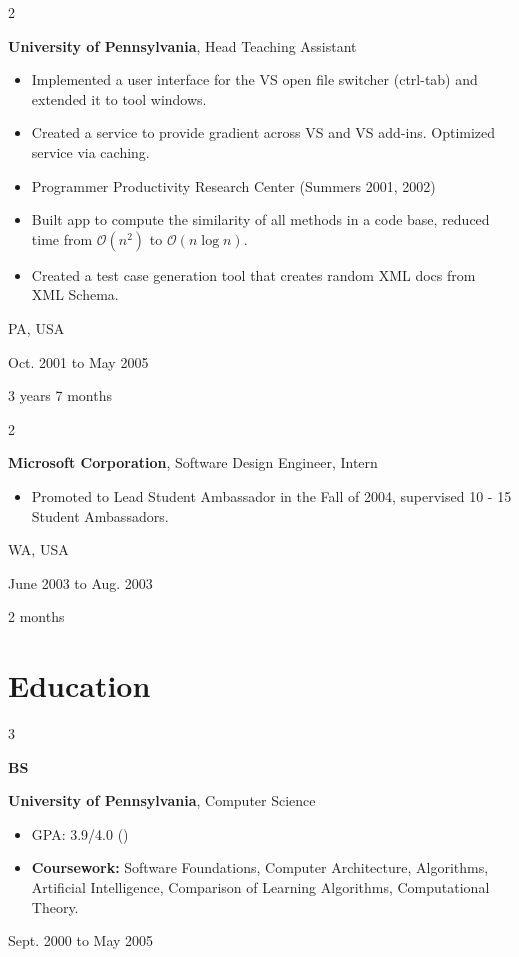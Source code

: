 \documentclass[10pt, letterpaper]{article}
\newenvironment{highlights}{
    \begin{itemize}[
        topsep=0.10 cm,
        parsep=0.10 cm,
        partopsep=0pt,
        itemsep=0pt,
        leftmargin=0.4 cm + 10pt
    ]
    }{
    \end{itemize}
} %
\newenvironment{twocolentry}[2][]{
    \onecolentry
    \def\secondColumn{#2}
    \setcolumnwidth{\fill, 4.5 cm}
    \begin{paracol}{2}
    }{
        \switchcolumn \raggedleft \secondColumn
    \end{paracol}
    \endonecolentry
} %
\newenvironment{threecolentry}[3][]{
    \onecolentry
    \def\thirdColumn{#3}
    \setcolumnwidth{1 cm, \fill, 4.5 cm}
    \begin{paracol}{3}
    {\raggedright #2} \switchcolumn
    }{
    \switchcolumn \raggedleft \thirdColumn
    \end{paracol}
    \endonecolentry
} %
\let\hrefWithoutArrow\href
\renewcommand{\href}[2]{\hrefWithoutArrow{#1}{\mbox{\ifthenelse{\equal{#2}{}}{ }{#2 }\raisebox{.15ex}{\footnotesize \faExternalLink*}}}}
\begin{document}
    \vspace{0.2 cm}

    \begin{twocolentry}{
        PA, USA

        Oct. 2001 to May 2005

        3 years 7 months
    }
        \textbf{University of Pennsylvania}, Head Teaching Assistant
        \begin{highlights}
            \item Implemented a user interface for the VS open file switcher (ctrl-tab) and extended it to tool windows.
            \item Created a service to provide gradient across VS and VS add-ins. Optimized service via caching.
            \item Programmer Productivity Research Center (Summers 2001, 2002)
            \item Built app to compute the similarity of all methods in a code base, reduced time from $\mathcal{O}(n^2)$ to $\mathcal{O}(n \log n)$.
            \item Created a test case generation tool that creates random XML docs from XML Schema.
        \end{highlights}
    \end{twocolentry}


    \vspace{0.2 cm}

    \begin{twocolentry}{
        WA, USA

        June 2003 to Aug. 2003

        2 months
    }
        \textbf{Microsoft Corporation}, Software Design Engineer, Intern
        \begin{highlights}
            \item Promoted to Lead Student Ambassador in the Fall of 2004, supervised 10 - 15 Student Ambassadors.
        \end{highlights}
    \end{twocolentry}

    \section{Education}

    \begin{threecolentry}{\textbf{BS}}{
        Sept. 2000 to May 2005
    }
        \textbf{University of Pennsylvania}, Computer Science
        \begin{highlights}
            \item GPA: 3.9/4.0 (\href{https://example.com}{Transcript})
            \item \textbf{Coursework:} Software Foundations, Computer Architecture, Algorithms, Artificial Intelligence, Comparison of Learning Algorithms, Computational Theory.
        \end{highlights}
    \end{threecolentry}
\end{document}
